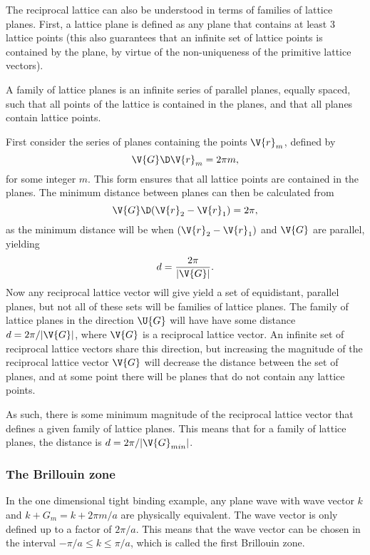 \documentclass[main.tex]{subfiles}
\begin{document}
	The reciprocal lattice can also be understood in terms of families of lattice planes. First, a lattice plane is defined as any plane that contains at least 3 lattice points (this also guarantees that an infinite set of lattice points is contained by the plane, by virtue of the non-uniqueness of the primitive lattice vectors). 
	
	A family of lattice planes is an infinite series of parallel planes, equally spaced, such that all points of the lattice is contained in the planes, and that all planes contain lattice points.
	
	First consider the series of planes containing the points $ \V{r}_m $, defined by
	\begin{equation}
		\V{G} \D \V{r}_m = 2\pi m,
	\end{equation}
	for some integer $ m $. This form ensures that all lattice points are contained in the planes. The minimum distance between planes can then be calculated from
	\begin{equation}
		\V{G} \D (\V{r}_2 - \V{r}_1) = 2\pi,
	\end{equation}
	as the minimum distance will be when $ (\V{r}_2-\V{r}_1) $ and $ \V{G} $ are parallel, yielding
	\begin{equation}
		d = \frac{2\pi}{|\V{G}|}.
	\end{equation}
	Now any reciprocal lattice vector will give yield a set of equidistant, parallel planes, but not all of these sets will be families of lattice planes. The family of lattice planes in the direction $ \U{G} $ will have have some distance $ d = 2\pi /|\V{G}| $, where $ \V{G} $ is a reciprocal lattice vector. An infinite set of reciprocal lattice vectors share this direction, but increasing the magnitude of the reciprocal lattice vector $ \V{G} $ will decrease the distance between the set of planes, and at some point there will be planes that do not contain any lattice points.
	
	As such, there is some minimum magnitude of the reciprocal lattice vector that defines a given family of lattice planes. This means that for a family of lattice planes, the distance is $ d = 2\pi /| \V{G}_{min}| $.
	
	\subsubsection{The Brillouin zone}
	In the one dimensional tight binding example, any plane wave with wave vector $ k $ and $ k + G_m = k + 2\pi m/a $ are physically equivalent. The wave vector is only defined up to a factor of $ 2 \pi / a $. This means that the wave vector can be chosen in the interval $ -\pi /a \leq k \leq \pi/a $, which is called the first Brillouin zone.
	
\end{document}
